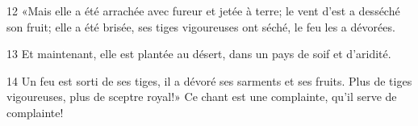 
12 «Mais elle a été arrachée avec fureur et jetée à terre; le vent d’est a desséché son fruit; elle a été brisée, ses tiges vigoureuses ont séché, le feu les a dévorées.

13 Et maintenant, elle est plantée au désert, dans un pays de soif et d’aridité.

14 Un feu est sorti de ses tiges, il a dévoré ses sarments et ses fruits. Plus de tiges vigoureuses, plus de sceptre royal!» Ce chant est une complainte, qu’il serve de complainte!